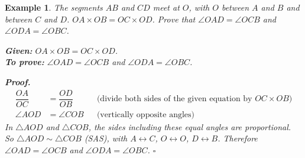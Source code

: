 \documentclass[11pt,a4paper]{article}
\theoremstyle{brand}
\theoremstyle{branddef}
\newtheorem{example}{Example}[section]
\newcommand{\tr}{\triangle}
\begin{document}
\begin{example}
The segments $AB$ and $CD$ meet at $O$, with $O$ between $A$ and $B$ and between $C$ and $D$. $OA\times OB=OC\times OD$. Prove that $\angle OAD=\angle OCB$ and $\angle ODA=\angle OBC$.

\begin{center}\end{center}

\textbf{Given:} $OA\times OB=OC\times OD$.\\
\textbf{To prove:} $\angle OAD=\angle OCB$ and $\angle ODA=\angle OBC$.

\textbf{Proof.}
\[
\begin{aligned}
\dfrac{OA}{OC}&=\dfrac{OD}{OB} &&\text{(divide both sides of the given equation by $OC\times OB$)}\\
\angle AOD&=\angle COB &&\text{(vertically opposite angles)}
\end{aligned}
\]
In $\tr AOD$ and $\tr COB$, the sides including these equal angles are proportional. So $\tr AOD\sim\tr COB$ (SAS), with $A\leftrightarrow C$, $O\leftrightarrow O$, $D\leftrightarrow B$. Therefore $\angle OAD=\angle OCB$ and $\angle ODA=\angle OBC$. \hfill$\square$
\end{example}
\end{document}
